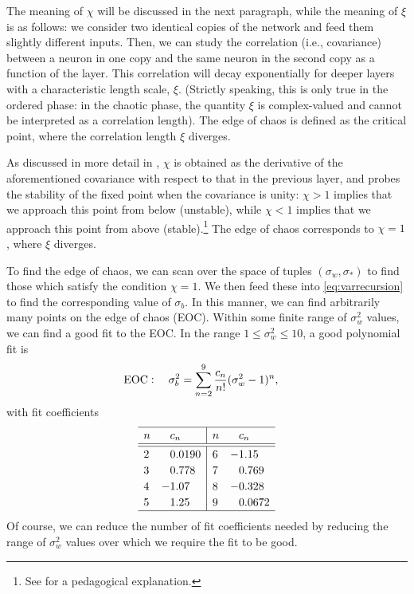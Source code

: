 The meaning of $\chi$ will be discussed in the next paragraph, while the meaning of $\xi$ is as follows: we consider two identical copies of the network and feed them slightly different inputs. Then, we can study the correlation (i.e., covariance) between a neuron in one copy and the same neuron in the second copy as a function of the layer. This correlation will decay exponentially for deeper layers with a characteristic length scale, $\xi$. (Strictly speaking, this is only true in the ordered phase: in the chaotic phase, the quantity $\xi$ is complex-valued and cannot be interpreted as a correlation length). The edge of chaos is defined as the critical point, where the correlation length $\xi$ diverges.

As discussed in more detail in \cite{arxiv.1606.05340, 2016arXiv161101232S}, $\chi$ is obtained as the derivative of the aforementioned covariance with respect to that in the previous layer, and probes the stability of the fixed point when the covariance is unity: $\chi>1$ implies that we approach this point from below (unstable), while $\chi<1$ implies that we approach this point from above (stable).\footnote{See \cite{roCrit} for a pedagogical explanation.} The edge of chaos corresponds to $\chi=1$, where $\xi$ diverges.  

To find the edge of chaos, we can scan over the space of tuples $(\sigma_w, \sigma_*)$ to find those which satisfy the condition $\chi=1$. We then feed these into \eqref{eq:varrecursion} to find the corresponding value of $\sigma_b$. In this manner, we can find arbitrarily many points on the edge of chaos (EOC). Within some finite range of $\sigma_{w}^{2}$ values, we can find a good fit to the EOC. In the range $1 \leq \sigma_{w}^{2} \leq 10$, a good polynomial fit is
\begin{align} \label{eq:eocfit}
	{\rm EOC}: \quad \sigma_{b}^{2} &= \sum_{n=2}^{9} \frac{c_n}{n!} ( \sigma_{w}^{2} - 1 )^n,
\end{align}
with fit coefficients
%
\begin{equation}
	\setlength{\tabcolsep}{5pt}
	\renewcommand{\arraystretch}{1.2}
	\begin{tabular}{ll|ll}
		\hline
		$n$ & $\phantom{-} c_n$ & $n$ & $\phantom{-} c_n$ \\
		\hline\hline
		2 & $\phantom{-} 0.0190$ & 6 & $-1.15$ \\
		3 & $\phantom{-} 0.778$ & 7 & $\phantom{-} 0.769$ \\
		4 & $-1.07$ & 8 & $-0.328$ \\
		5 & $\phantom{-} 1.25$ & 9 & $\phantom{-} 0.0672$ \\
		\hline
	\end{tabular}
\end{equation}
%
Of course, we can reduce the number of fit coefficients needed by reducing the range of $\sigma_{w}^{2}$ values over which we require the fit to be good.


